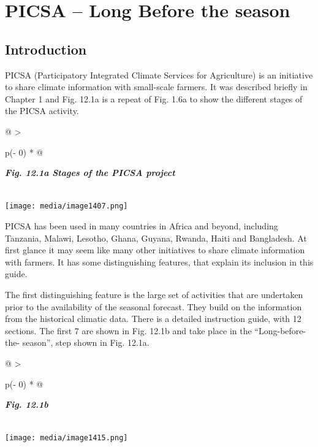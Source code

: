 \documentclass[
  letterpaper,
  DIV=11,
  numbers=noendperiod]{scrreprt}
\begin{document}

\chapter{PICSA -- Long Before the
season}\label{picsa-long-before-the-season}

\section{Introduction}\label{introduction-11}

PICSA (Participatory Integrated Climate Services for Agriculture) is an
initiative to share climate information with small-scale farmers. It was
described briefly in Chapter 1 and Fig. 12.1a is a repeat of Fig. 1.6a
to show the different stages of the PICSA activity.

\begin{longtable}[]{@{}
  >{\raggedright\arraybackslash}p{(\columnwidth - 0\tabcolsep) * }@{}}
\toprule\noalign{}
\begin{minipage}[b]{\linewidth}\raggedright
\textbf{\emph{Fig. 12.1a Stages of the PICSA project}}
\end{minipage} \\
\midrule\noalign{}
\endhead
\bottomrule\noalign{}
\endlastfoot
\texttt{[image: media/image1407.png]} \\
\end{longtable}

PICSA has been used in many countries in Africa and beyond, including
Tanzania, Malawi, Lesotho, Ghana, Guyana, Rwanda, Haiti and Bangladesh.
At first glance it may seem like many other initiatives to share climate
information with farmers. It has some distinguishing features, that
explain its inclusion in this guide.

The first distinguishing feature is the large set of activities that are
undertaken prior to the availability of the seasonal forecast. They
build on the information from the historical climatic data. There is a
detailed instruction guide, with 12 sections. The first 7 are shown in
Fig. 12.1b and take place in the ``Long-before-the- season'', step shown
in Fig. 12.1a.

\begin{longtable}[]{@{}
  >{\raggedright\arraybackslash}p{(\columnwidth - 0\tabcolsep) * }@{}}
\toprule\noalign{}
\begin{minipage}[b]{\linewidth}\raggedright
\textbf{\emph{Fig. 12.1b}}
\end{minipage} \\
\midrule\noalign{}
\endhead
\bottomrule\noalign{}
\endlastfoot
\texttt{[image: media/image1415.png]} \\
\end{longtable}
\end{document}
